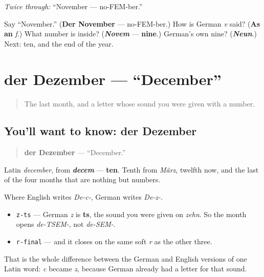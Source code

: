 \emph{Twice through:} \textquotedblleft{}November — no-FEM-ber.\textquotedblright{}

\begin{tcolorbox}[breakable,colback=teal!4,colframe=teal!35!black,title={Before you move on}]
Say \textquotedblleft{}November.\textquotedblright{} (\textbf{Der November} — no-FEM-ber.) How is German \emph{v} said? (\textbf{As an} \emph{f}.) What number is inside? (\emph{\textbf{Novem}} — \textbf{nine}.) German's own nine? (\emph{\textbf{Neun}}.) Next: ten, and the end of the year.
\end{tcolorbox}
\section[der Dezember]{der Dezember — \textquotedblleft{}December\textquotedblright{}}

\label{lesson:GE-C09-dezember}



\begin{quote}
The last month, and a letter whose sound you were given with a number.
\end{quote}

\subsection*{You'll want to know: der Dezember}
\begin{quote}
\textbf{der Dezember} — \textquotedblleft{}December.\textquotedblright{}
\end{quote}

Latin \emph{december}, from \emph{\textbf{decem}} — \textbf{ten}. Tenth from \emph{März}, twelfth now, and the last of the four months that are nothing but numbers.

Where English writes \emph{De-c-}, German writes \emph{De-z-}.

\begin{sounds}
\begin{itemize}
\raggedright
  \item \texttt{z-ts} — German \emph{z} is \textbf{ts}, the sound you were given on \emph{zehn}. So the month opens \emph{de-TSEM-}, not \emph{de-SEM-}.
  \item \texttt{r-final} — and it closes on the same soft \emph{r} as the other three.
\end{itemize}

That is the whole difference between the German and English versions of one Latin word: \emph{c} became \emph{z}, because German already had a letter for that sound.
\end{sounds}

